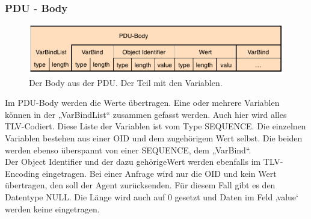 \documentclass[11pt,a4paper]{article}
\begin{document}
\subsubsection{PDU - Body}
\begin{figure}[h]
	\centering
	\includegraphics[scale=1]{Bilder/SNMPv1-PDU-Body}
	\caption{Der Body aus der PDU. Der Teil mit den Variablen.}
\end{figure}
Im PDU-Body werden die Werte übertragen. Eine oder mehrere Variablen können in der „VarBindList“ zusammen gefasst werden. Auch hier wird alles TLV-Codiert. Diese Liste der Variablen ist vom Type SEQUENCE. Die einzelnen Variablen bestehen aus einer OID und dem zugehörigem Wert selbst. Die beiden werden ebenso überspannt von einer SEQUENCE, dem „VarBind“.\\
Der Object Identifier und der dazu gehörigeWert werden ebenfalls im TLV-Encoding eingetragen. Bei einer Anfrage wird nur die OID und kein Wert übertragen, den soll der Agent zurücksenden. Für diesem Fall gibt es den Datentype NULL. Die Länge wird auch auf 0 gesetzt und Daten im Feld ‚value‘ werden keine eingetragen.\\
\end{document}
